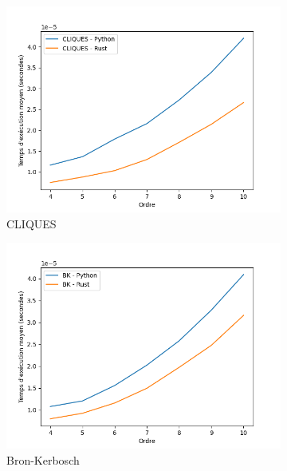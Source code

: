 \documentclass[12pt,a4paper]{article}
\begin{document}
\begin{figure}[ht]
  \centering
  \begin{subfigure}[b]{0.24\textwidth}
    \includegraphics[width=\textwidth]{images/total_new_pyrust_CLIQUES_plot.png}
  \caption{CLIQUES}%
  \label{subfig:pr2_cliques}
  \end{subfigure}
  \begin{subfigure}[b]{0.24\textwidth}
    \includegraphics[width=\textwidth]{images/total_new_pyrust_BK_plot.png}
  \caption{Bron-Kerbosch}%
  \label{subfig:pr2_bk}
  \end{subfigure}
  \begin{subfigure}[b]{0.24\textwidth}

\end{subfigure}
\end{figure}
\end{document}
